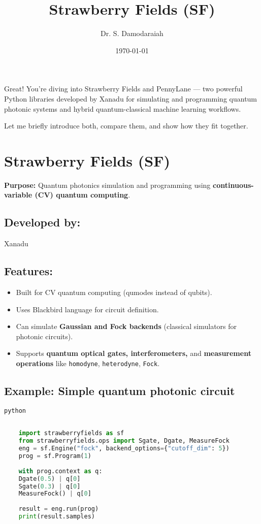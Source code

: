 \documentclass[12]{article}
\title{Strawberry Fields (SF)}
\author{Dr. S. Damodaraiah}
\date{\today}
\begin{document}
\maketitle
Great! You're diving into Strawberry Fields and PennyLane — two powerful Python libraries developed by Xanadu for simulating and programming quantum photonic systems and hybrid quantum-classical machine learning workflows.

Let me briefly introduce both, compare them, and show how they fit together.
	
\section*{ Strawberry Fields (SF)}
\textbf{Purpose:} Quantum photonics simulation and programming using \textbf{continuous-variable (CV) quantum computing}.
\subsection*{Developed by:}	
Xanadu
\subsection*{Features:}
\begin{itemize}
	\item Built for CV quantum computing (qumodes instead of qubits).
	\item Uses Blackbird language for circuit definition.
	\item Can simulate \textbf{Gaussian and Fock backends} (classical simulators for photonic circuits).
	\item Supports \textbf{quantum optical gates, interferometers,} and \textbf{measurement operations} like \colorbox{gray!30}{\texttt{homodyne}}, \colorbox{gray!30}{\texttt{heterodyne}}, \colorbox{gray!30}{\texttt{Fock}}.
\end{itemize}
\newpage
\subsection*{Example: Simple quantum photonic circuit}

\begin{lstlisting}[language=python]
	python
	
	
	import strawberryfields as sf
	from strawberryfields.ops import Sgate, Dgate, MeasureFock
	eng = sf.Engine("fock", backend_options={"cutoff_dim": 5})
	prog = sf.Program(1)
	
	with prog.context as q:
	Dgate(0.5) | q[0]
	Sgate(0.3) | q[0]
	MeasureFock() | q[0]
	
	result = eng.run(prog)
	print(result.samples)
\end{lstlisting}
\end{document}

